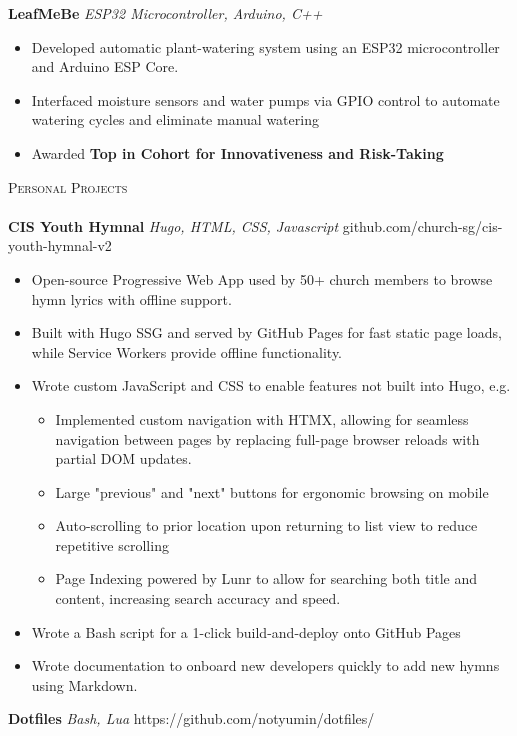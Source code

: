 \documentclass[a4paper]{article}
\newcommand{\lineunder} {
    \vspace*{-8pt} \\
    \hspace*{-18pt} \hrulefill \\
}
\newcommand{\header} [1] {
    {\hspace*{-18pt}\vspace*{6pt} \textsc{#1}}
    \vspace*{-6pt} \lineunder
}
\begin{document}
\vspace*{2mm}
{\textbf{LeafMeBe}} {\sl ESP32 Microcontroller, Arduino, C++} \\
\vspace{-1mm}
\begin{itemize} \itemsep 0.5pt
    \item Developed automatic plant-watering system using an ESP32 microcontroller and Arduino ESP Core.
    \item Interfaced moisture sensors and water pumps via GPIO control to automate watering cycles and eliminate manual watering
    \item Awarded \textbf{Top in Cohort for Innovativeness and Risk-Taking}
\end{itemize}
\vspace*{2mm}

\header{Personal Projects}
\vspace{1mm}
{\textbf{CIS Youth Hymnal}} {\sl Hugo, HTML, CSS, Javascript} \hfill github.com/church-sg/cis-youth-hymnal-v2\\
\vspace{-1mm}
\begin{itemize} \itemsep 0.5pt
    \item Open-source Progressive Web App used by 50+ church members to browse hymn lyrics with offline support.
    \item Built with Hugo SSG and served by GitHub Pages for fast static page loads, while Service Workers provide offline functionality.
    \item Wrote custom JavaScript and CSS to enable features not built into Hugo, e.g.
      \vspace{-2mm}
      \begin{itemize} \itemsep 0.2pt
        \item Implemented custom navigation with HTMX, allowing for seamless navigation between pages by replacing full-page browser reloads with partial DOM updates.
        \item Large "previous" and "next" buttons for ergonomic browsing on mobile
        \item Auto-scrolling to prior location upon returning to list view to reduce repetitive scrolling
        \item Page Indexing powered by Lunr to allow for searching both title and content, increasing search accuracy and speed.
      \end{itemize}
    \item Wrote a Bash script for a 1-click build-and-deploy onto GitHub Pages
    \item Wrote documentation to onboard new developers quickly to add new hymns using Markdown.
\end{itemize}
\vspace*{2mm}
{\textbf{Dotfiles}} {\sl Bash, Lua} \hfill https://github.com/notyumin/dotfiles/\\
\end{document}
